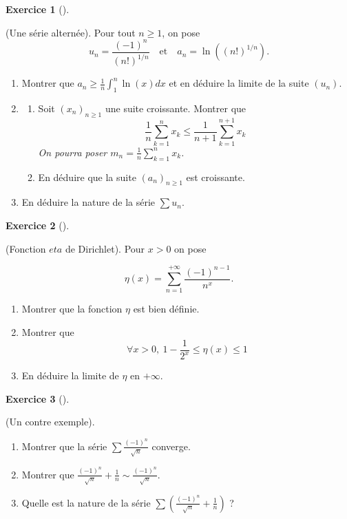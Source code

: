 \documentclass[
  french,
  letterpaper,
  DIV=11,
  numbers=noendperiod]{scrreprt}
\theoremstyle{plain}
\theoremstyle{definition}
\theoremstyle{plain}
\theoremstyle{plain}
\theoremstyle{definition}
\newtheorem{exercise}{Exercice}[chapter]
\theoremstyle{definition}
\theoremstyle{plain}
\theoremstyle{remark}
\begin{document}
\begin{exercise}[]\protect\hypertarget{exr-02-alt-CCINP}{}\label{exr-02-alt-CCINP}

(Une série alternée). Pour tout \(n\geqslant 1\), on pose
\[u_n = \frac{(-1)^n}{(n!)^{1/n}}\quad \text{et}\quad a_n = \ln((n!)^{1/n}).\]

\begin{enumerate}
\def\labelenumi{\arabic{enumi}.}
\item
  Montrer que
  \(\displaystyle a_n \geqslant\frac{1}{n}\int_1^n \ln(x)dx\) et en
  déduire la limite de la suite \((u_n)\).
\item
  \begin{enumerate}
  \def\labelenumii{\alph{enumii}.}
  \item
    Soit \((x_n)_{n\geqslant 1}\) une suite croissante. Montrer que
    \[\frac{1}{n}\sum_{k=1}^n x_k \leqslant \frac{1}{n+1}\sum_{k=1}^{n+1}x_k\]
    \emph{On pourra poser \(m_n = \frac{1}{n}\sum_{k=1}^{n}x_k\).}
  \item
    En déduire que la suite \((a_n)_{n\geqslant 1}\) est croissante.
  \end{enumerate}
\item
  En déduire la nature de la série \(\sum u_n\).
\end{enumerate}

\end{exercise}

\begin{exercise}[]\protect\hypertarget{exr-02-eta}{}\label{exr-02-eta}

(Fonction \(eta\) de Dirichlet). Pour \(x>0\) on pose

\[
\eta(x) = \sum_{n=1}^{+\infty}\frac{(-1)^{n-1}}{n^x}.
\]

\begin{enumerate}
\def\labelenumi{\arabic{enumi}.}
\item
  Montrer que la fonction \(\eta\) est bien définie.
\item
  Montrer que
  \[\forall x>0,\ 1-\frac{1}{2^x}\leqslant\eta(x)\leqslant 1\]
\item
  En déduire la limite de \(\eta\) en \(+\infty\).
\end{enumerate}

\end{exercise}

\begin{exercise}[]\protect\hypertarget{exr-02-0005}{}\label{exr-02-0005}

(Un contre exemple).

\begin{enumerate}
\def\labelenumi{\arabic{enumi}.}
\item
  Montrer que la série \(\sum \frac{(-1)^n}{\sqrt{n}}\) converge.
\item
  Montrer que
  \(\frac{(-1)^n}{\sqrt{n}} + \frac{1}{n}\sim \frac{(-1)^n}{\sqrt{n}}\).
\item
  Quelle est la nature de la série
  \(\sum \left(\frac{(-1)^n}{\sqrt{n}}+\frac{1}{n}\right)\) ?
\end{enumerate}

\end{exercise}
\end{document}
